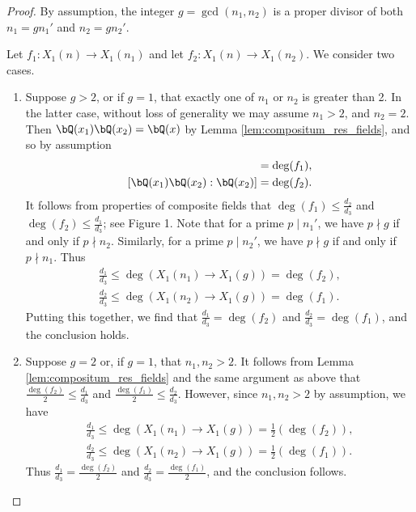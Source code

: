 \documentclass[11pt,reqno]{amsart}
\theoremstyle{plain}
\theoremstyle{definition}
\newcommand{\Q}{\bQ}
\begin{document}
    \begin{proof}  By assumption, the integer $g=\gcd(n_1,n_2)$ is a proper divisor of both $n_1=gn_1'$ and $n_2=gn_2'$.
    
    Let $f_1: X_1(n) \rightarrow X_1(n_1)$ and let $f_2: X_1(n) \rightarrow X_1(n_2)$. We consider two cases.
    \begin{enumerate}
    \item Suppose $ g>2$, or if $g=1$, that exactly one of $n_1$ or $n_2$ is greater than 2. In the latter case, without loss of generality we may assume $n_1>2$, and $n_2=2$. Then $\Q(x_1)\Q(x_2)=\Q(x)$ by Lemma \ref{lem:compositum_res_fields}, and so by assumption
    \begin{align*}
    [\Q(x_1)\Q(x_2):\Q(x_1)]=\deg(f_1),\\
    [\Q(x_1)\Q(x_2):\Q(x_2)]=\deg(f_2).
    \end{align*}
        It follows from properties of composite fields that $\deg(f_1) \leq \frac{d_2}{d_3}$ and $\deg(f_2) \leq \frac{d_1}{d_3}$; see Figure 1. Note that for a prime $p \mid n_1'$, we have $p \nmid g$ if and only if $p \nmid n_2$. Similarly, for a prime $p \mid n_2'$, we have $p \nmid g$ if and only if $p \nmid n_1$. Thus
    \begin{align*}
    \frac{d_1}{d_3} \leq \deg(X_1(n_1) \rightarrow X_1(g))=\deg(f_2),\\
        \frac{d_2}{d_3} \leq \deg(X_1(n_2) \rightarrow X_1(g))=\deg(f_1).
    \end{align*}
    Putting this together, we find that $\frac{d_1}{d_3}=\deg(f_2)$ and $\frac{d_2}{d_3}=\deg(f_1)$, and the conclusion holds.
    \item Suppose $g=2$ or, if $g=1$, that $n_1,n_2>2$. It follows from Lemma \ref{lem:compositum_res_fields} and the same argument as above that $\frac{\deg(f_2)}{2} \leq \frac{d_1}{d_3}$ and $\frac{\deg(f_1)}{2} \leq \frac{d_2}{d_3}$. However, since $n_1,n_2>2$ by assumption, we have
    \begin{align*}
    \frac{d_1}{d_3} \leq \deg(X_1(n_1) \rightarrow X_1(g))=\frac{1}{2}(\deg(f_2)),\\
       \frac{ d_2}{d_3} \leq \deg(X_1(n_2) \rightarrow X_1(g))=\frac{1}{2}(\deg(f_1)).
    \end{align*}
   Thus $\frac{d_1}{d_3}=\frac{\deg(f_2)}{2}$ and $\frac{d_2}{d_3}=\frac{\deg(f_1)}{2}$, and the conclusion follows. \qedhere
      \end{enumerate}
    \end{proof}
\end{document}
